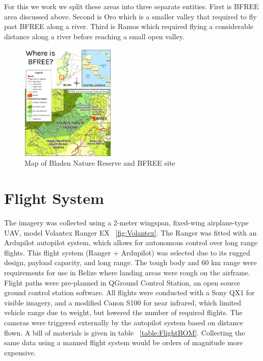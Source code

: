 For this we work we split these areas into three separate entities. First is BFREE area discussed above. Second is Oro which is a smaller valley that required to fly past BFREE along a river. Third is Ramos which required flying a considerable distance along a river before reaching a small open valley.

\begin{figure}[ht]
\includegraphics[width=0.4\textwidth]{Figures/BFREE-Map.jpg}
\caption{Map of Bladen Nature Reserve and BFREE site}
\label{fig:BFREE-Map}
\end{figure}

\section{Flight System}

The imagery was collected using a 2-meter wingspan, fixed-wing airplane-type UAV, model Volantex Ranger EX  ~\ref{fig:Volantex}. The Ranger was fitted with an Ardupilot autopilot system, which allows for autonomous control over long range flights. This flight system (Ranger + Ardupilot) was selected due to its rugged design, payload capacity, and long range. The tough body and 60 km range were requirements for use in Belize where landing areas were rough on the airframe. Flight paths were pre-planned in QGround Control Station, an open source ground control station software. All flights were conducted with a Sony QX1 for visible imagery, and a modified Canon S100 for near infrared, which limited vehicle range due to weight, but lowered the number of required flights. The cameras were triggered externally by the autopilot system based on distance flown. A bill of materials is given in table ~\ref{table:FlightBOM}. Collecting the same data using a manned flight system would be orders of magnitude more expensive.



